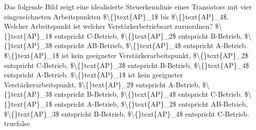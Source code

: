     {Das folgende Bild zeigt eine idealisierte Steuerkennlinie eines Transistors mit vier eingezeichneten Arbeitspunkten \$\textbackslash\{\}text\{AP\}\_1\$ bis \$\textbackslash\{\}text\{AP\}\_4\$.  Welcher Arbeitspunkt ist welcher Verstärkerbetriebsart zuzuordnen?}
    {\$\textbackslash\{\}text\{AP\}\_1\$ entspricht C-Betrieb, \$\textbackslash\{\}text\{AP\}\_2\$ entspricht B-Betrieb, \$\textbackslash\{\}text\{AP\}\_3\$ entspricht AB-Betrieb, \$\textbackslash\{\}text\{AP\}\_4\$ entspricht A-Betrieb.}
    {\$\textbackslash\{\}text\{AP\}\_1\$ ist kein geeigneter Verstärkerarbeitspunkt, \$\textbackslash\{\}text\{AP\}\_2\$ entspricht C-Betrieb, \$\textbackslash\{\}text\{AP\}\_3\$ entspricht B-Betrieb, \$\textbackslash\{\}text\{AP\}\_4\$ entspricht A-Betrieb.}
    {\$\textbackslash\{\}text\{AP\}\_1\$ ist kein geeigneter Verstärkerarbeitspunkt, \$\textbackslash\{\}text\{AP\}\_2\$ entspricht A-Betrieb, \$\textbackslash\{\}text\{AP\}\_3\$ entspricht B-Betrieb, \$\textbackslash\{\}text\{AP\}\_4\$ entspricht C-Betrieb.}
    {\$\textbackslash\{\}text\{AP\}\_1\$ entspricht A-Betrieb, \$\textbackslash\{\}text\{AP\}\_2\$ entspricht AB-Betrieb, \$\textbackslash\{\}text\{AP\}\_3\$ entspricht B-Betrieb, \$\textbackslash\{\}text\{AP\}\_4\$ entspricht C-Betrieb.}
    {true}{false}